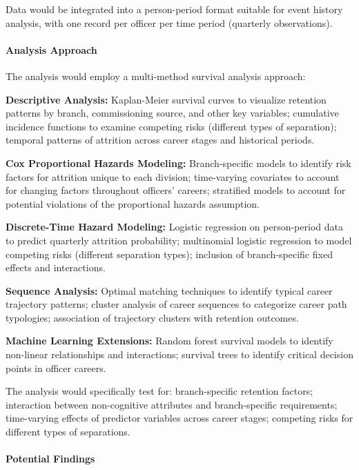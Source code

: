 \documentclass[../main.tex]{subfiles}
\begin{document}
Data would be integrated into a person-period format suitable for event history analysis, with one record per officer per time period (quarterly observations).

\paragraph{Analysis Approach}

The analysis would employ a multi-method survival analysis approach:

\textbf{Descriptive Analysis:} Kaplan-Meier survival curves to visualize retention patterns by branch, commissioning source, and other key variables; cumulative incidence functions to examine competing risks (different types of separation); temporal patterns of attrition across career stages and historical periods.

\textbf{Cox Proportional Hazards Modeling:} Branch-specific models to identify risk factors for attrition unique to each division; time-varying covariates to account for changing factors throughout officers' careers; stratified models to account for potential violations of the proportional hazards assumption.

\textbf{Discrete-Time Hazard Modeling:} Logistic regression on person-period data to predict quarterly attrition probability; multinomial logistic regression to model competing risks (different separation types); inclusion of branch-specific fixed effects and interactions.

\textbf{Sequence Analysis:} Optimal matching techniques to identify typical career trajectory patterns; cluster analysis of career sequences to categorize career path typologies; association of trajectory clusters with retention outcomes.

\textbf{Machine Learning Extensions:} Random forest survival models to identify non-linear relationships and interactions; survival trees to identify critical decision points in officer careers.

The analysis would specifically test for: branch-specific retention factors; interaction between non-cognitive attributes and branch-specific requirements; time-varying effects of predictor variables across career stages; competing risks for different types of separations.

\paragraph{Potential Findings}
\end{document}
